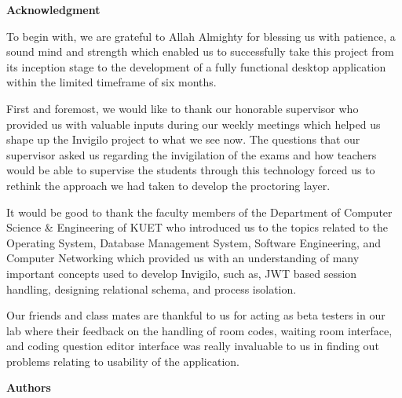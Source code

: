 \documentclass[12pt, a4paper]{report}
\newcommand{\blanklines}[1]{\vspace{#1\dimexpr 18pt\relax}}
\begin{document}
\newpage
\setcounter{page}{2}
\thispagestyle{plain}

\begin{center}
  {\fontsize{16}{24}\bfseries Acknowledgment}
\end{center}

\blanklines{2}

\begin{justify}
  {\fontsize{12}{18}\selectfont
    To begin with, we are grateful to Allah Almighty for blessing us with patience, a sound mind and strength which enabled us to successfully take this project from its inception stage to the development of a fully functional desktop application within the limited timeframe of six months.

     First and foremost, we would like to thank our honorable supervisor who provided us with valuable inputs during our weekly meetings which helped us shape up the Invigilo project to what we see now. The questions that our supervisor asked us regarding the invigilation of the exams and how teachers would be able to supervise the students through this technology forced us to rethink the approach we had taken to develop the proctoring layer.

    It would be good to thank the faculty members of the Department of Computer Science \& Engineering of KUET who introduced us to the topics related to the Operating System, Database Management System, Software Engineering, and Computer Networking which provided us with an understanding of many important concepts used to develop Invigilo, such as, JWT based session handling, designing relational schema, and process isolation.

   Our friends and class mates are thankful to us for acting as beta testers in our lab where their feedback on the handling of room codes, waiting room interface, and coding question editor interface was really invaluable to us in finding out problems relating to usability of the application.
  }
\end{justify}

\vspace{12pt}
\begin{flushright}
  {\fontsize{12}{18}\bfseries Authors}
\end{flushright}

\newpage
\setcounter{page}{3}
\thispagestyle{plain}
\end{document}
